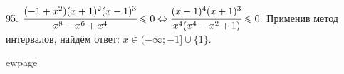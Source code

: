 95. $\cfrac{(-1+x^2)(x+1)^2(x-1)^3}{x^8-x^6+x^4}\leqslant0\Leftrightarrow\cfrac{(x-1)^4(x+1)^3}{x^4(x^4-x^2+1)}\leqslant0.$ Применив метод интервалов, найдём ответ: $x\in(-\infty;-1]\cup\{1\}.$
\begin{figure}[ht!]
\end{figure}

ewpage
